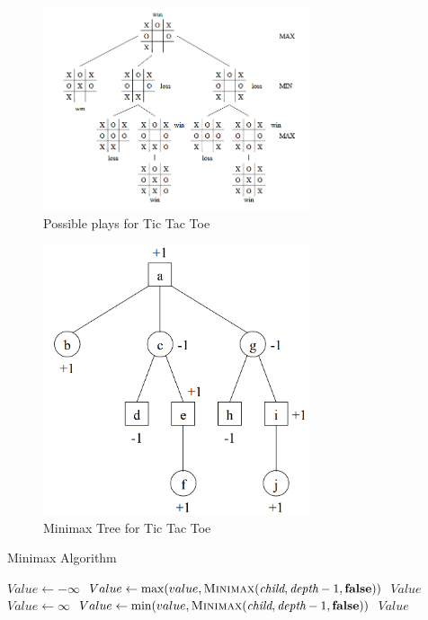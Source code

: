 \documentclass{article}
\begin{document}
\begin{figure}
    \centering
    \includegraphics[width=0.7\textwidth]{images/ticTacToe.png}
    \caption{Possible plays for Tic Tac Toe}
    \label{fig:ticTacToe}
\end{figure}

\begin{figure}
    \centering
    \includegraphics[width=0.7\textwidth]{images/minimax.png}
    \caption{Minimax Tree for Tic Tac Toe}
    \label{fig:minimax}
\end{figure}

\begin{algorithm}[h]
    \caption{Minimax Algorithm}
    \begin{algorithmic}
        \State \Return {}
        \EndIf
        \State $Value \gets -\infty$
        \State $Value \gets \max(value, \textsc{Minimax}(\textit{child}, \textit{depth} - 1, \textbf{false}))$
        \EndFor
        \State \Return $Value$
        \Else
        \State $Value \gets \infty$
        \State $Value \gets \min(value, \textsc{Minimax}(\textit{child}, \textit{depth} - 1, \textbf{false}))$
        \EndFor
        \State \Return $Value$
        \EndIf
        \EndFunction
    \end{algorithmic}
\end{algorithm}
\end{document}
